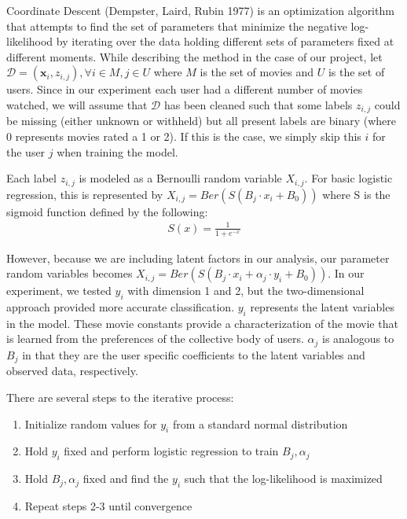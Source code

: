 \documentclass{article} %
\begin{document}
Coordinate Descent (Dempster, Laird, Rubin 1977) is an optimization algorithm that attempts to find the set of parameters that minimize the negative log-likelihood by iterating over the data holding different sets of parameters fixed at different moments. While describing the method in the case of our project, let $\mathcal{D} = (\textbf{x}_{i},z_{i,j}) ,  \forall i \in M , j \in U$ where $M$ is the set of movies and $U$ is the set of users. Since in our experiment each user had a different number of movies watched, we will assume that $\mathcal{D}$ has been cleaned such that some labels $z_{i,j}$ could be missing (either unknown or withheld) but all present labels are binary (where 0 represents movies rated a 1 or 2). If this is the case, we simply skip this $i$ for the user $j$ when training the model.

Each label $z_{i,j}$ is modeled as a Bernoulli random variable $X_{i,j}$. For basic logistic regression, this is represented by $X_{i,j} = Ber(S(B_j \cdot x_i + B_0))$ where S is the sigmoid function defined by the following:
\begin{align*}
S(x) = \frac{1}{1+e^{-x}}
\end{align*}

However, because we are including latent factors in our analysis, our parameter random variables becomes $X_{i,j} = Ber(S(B_j \cdot x_i + \alpha_j \cdot y_i + B_0))$. In our experiment, we tested $y_i $ with dimension 1 and 2, but the two-dimensional approach provided more accurate classification. $y_i$ represents the latent variables in the model. These movie constants provide a characterization of the movie that is learned from the preferences of the collective body of users. $\alpha_j$ is analogous to $B_j$ in that they are the user specific coefficients to the latent variables and observed data, respectively.

There are several steps to the iterative process:
\begin{enumerate}
\item Initialize random values for $y_i$  from a standard normal distribution
\item Hold $y_i$ fixed and perform logistic regression to train $B_j,\alpha_j$
\item Hold $B_j,\alpha_j$ fixed and find the $y_i$ such that the log-likelihood is maximized
\item Repeat steps 2-3 until convergence
\end{enumerate}
\end{document}
